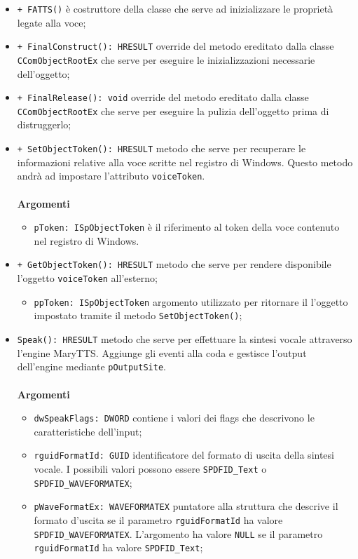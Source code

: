 \begin{itemize}
	\item \texttt{+ FATTS()} è costruttore della classe che serve ad inizializzare le proprietà legate alla voce;
	\item \texttt{+ FinalConstruct(): HRESULT} override del metodo ereditato dalla classe \texttt{CComObjectRootEx} che serve per eseguire le inizializzazioni necessarie dell'oggetto;
	\item \texttt{+ FinalRelease(): void} override del metodo ereditato dalla classe \texttt{CComObjectRootEx} che serve per eseguire la pulizia dell'oggetto prima di distruggerlo;
	\item \texttt{+ SetObjectToken(): HRESULT} metodo che serve per recuperare le informazioni relative alla voce scritte nel registro di Windows. Questo metodo andrà ad impostare l'attributo \texttt{voiceToken}.\\\\
	\textbf{Argomenti}
	\begin{itemize}
		\item \texttt{pToken: ISpObjectToken} è il riferimento al token della voce contenuto nel registro di Windows. 
	\end{itemize}
	\item \texttt{+ GetObjectToken(): HRESULT} metodo che serve per rendere disponibile l'oggetto \texttt{voiceToken} all'esterno;
	\begin{itemize}
		\item \texttt{ppToken: ISpObjectToken} argomento utilizzato per ritornare il l'oggetto impostato tramite il metodo \texttt{SetObjectToken()};
	\end{itemize}
	\item \texttt{Speak(): HRESULT} metodo che serve per effettuare la sintesi vocale attraverso l'engine MaryTTS. Aggiunge gli eventi alla coda e gestisce l'output dell'engine mediante \texttt{pOutputSite}.\\\\
	\textbf{Argomenti}
	\begin{itemize}
		\item \texttt{dwSpeakFlags: DWORD} contiene i valori dei flags che descrivono le caratteristiche dell'input;
		\item \texttt{rguidFormatId: GUID} identificatore del formato di uscita della sintesi vocale. I possibili valori possono essere \texttt{SPDFID\_Text} o \texttt{SPDFID\_WAVEFORMATEX};
		\item \texttt{pWaveFormatEx: WAVEFORMATEX} puntatore alla struttura che descrive il formato d'uscita se il parametro \texttt{rguidFormatId} ha valore \texttt{SPDFID\_WAVEFORMATEX}. L'argomento ha valore \texttt{NULL} se il parametro \texttt{rguidFormatId} ha valore \texttt{SPDFID\_Text};

\end{itemize}
\end{itemize}
